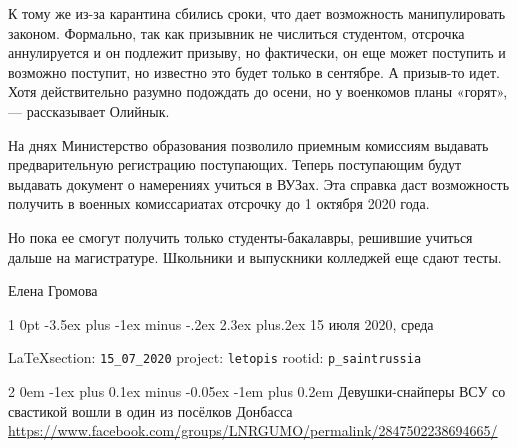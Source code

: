\documentclass[a4paper,11pt]{extreport}
\makeatletter
\renewcommand\section{%
  \clearpage
  \@startsection{section}%
    {1}%
    {0pt}%
    {-3.5ex plus -1ex minus -.2ex}%
    {2.3ex plus.2ex}%
    {\centering\normalfont\Huge\bfseries}%
}
\renewcommand\subsection{%
  \clearpage
    \@startsection{subsection}%
    {2}%
    {0em}%
    {-1ex plus 0.1ex minus -0.05ex}%
    {-1em plus 0.2em}%
    {\scshape\bfseries\Large}%
}
\makeatother
\begin{document}
К тому же из-за карантина сбились сроки, что дает возможность манипулировать
законом. Формально, так как призывник не числиться студентом, отсрочка
аннулируется и он подлежит призыву, но фактически, он еще может поступить и
возможно поступит, но известно это будет только в сентябре. А призыв-то идет.
Хотя действительно разумно подождать до осени, но у военкомов планы «горят», —
рассказывает Олийнык. 

На днях Министерство образования позволило приемным комиссиям выдавать
предварительную регистрацию поступающих. Теперь поступающим будут выдавать
документ о намерениях учиться в ВУЗах. Эта справка даст возможность получить в
военных комиссариатах отсрочку до 1 октября 2020 года. 

Но пока ее смогут получить только студенты-бакалавры, решившие учиться дальше
на магистратуре. Школьники и выпускники колледжей еще сдают тесты.

Елена Громова


 
 

\section{15 июля 2020, среда}
\label{sec:15_07_2020}


\vspace{0.5cm}
{\small\LaTeX section: \verb|15_07_2020| project: \verb|letopis| rootid: \verb|p_saintrussia|}
\vspace{0.5cm}

 
 
  
\subsection{Девушки-снайперы ВСУ со свастикой вошли в один из посёлков Донбасса}
\label{sec:15_07_2020.fb.lnr.1}
\url{https://www.facebook.com/groups/LNRGUMO/permalink/2847502238694665/}
\end{document}
